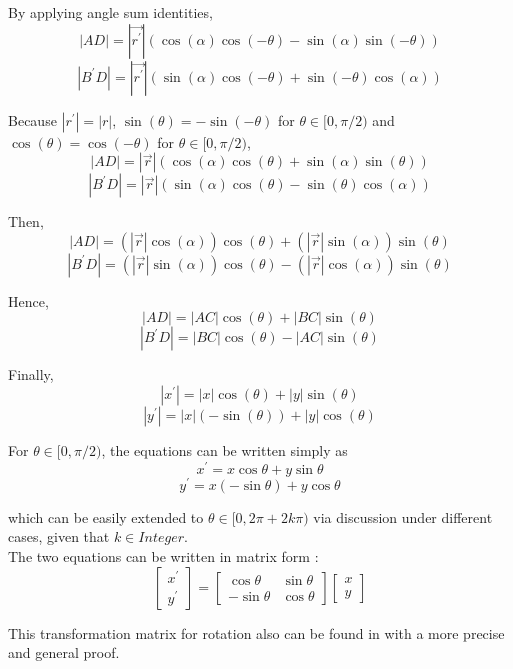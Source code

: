By applying angle sum identities,
$$|AD| = |\vec{r^{'}}| (\cos(\alpha)\cos(-\theta) - \sin(\alpha)\sin(-\theta))$$
$$|B^{'}D| = |\vec{r^{'}}| (\sin(\alpha)\cos(-\theta) + \sin(-\theta)\cos(\alpha))$$

Because $|r^{'}| = |r|$, $\sin(\theta) = - \sin(-\theta)$ for $\theta \in [0, \pi/2)$ and $\cos(\theta) = \cos(-\theta)$ for $\theta \in [0, \pi/2)$,
$$|AD| = |\vec{r}| (\cos(\alpha)\cos(\theta) + \sin(\alpha)\sin(\theta))$$
$$|B^{'}D| = |\vec{r}| (\sin(\alpha)\cos(\theta) - \sin(\theta)\cos(\alpha))$$

Then,
$$|AD| = (|\vec{r}|\cos(\alpha))\cos(\theta) + (|\vec{r}|\sin(\alpha))\sin(\theta)$$
$$|B^{'}D| = (|\vec{r}|\sin(\alpha))\cos(\theta) - (|\vec{r}|\cos(\alpha))\sin(\theta)$$

Hence,
$$|AD| = |AC|\cos(\theta) + |BC|\sin(\theta)$$
$$|B^{'}D| = |BC|\cos(\theta) - |AC|\sin(\theta)$$

Finally,
$$|x^{'}| = |x|\cos(\theta) + |y|\sin(\theta)$$
$$|y^{'}| = |x|(- \sin(\theta)) + |y|\cos(\theta)$$

For $\theta \in [0, \pi/2)$, the equations can be written simply as
$$ x^{'} = x\cos\theta + y\sin\theta$$
$$ y^{'} = x(- \sin\theta) + y\cos\theta$$

which can be easily extended to $\theta \in [ 0, 2\pi + 2k\pi)$ via discussion under different cases, given that $k \in Integer$.\\

The two equations can be written in matrix form :
\begin{equation} \label{Equ_ori}
  \begin{bmatrix}
   x^{'} \\ y^{'}
   \end{bmatrix} =   \begin{bmatrix}
      \cos\theta & \sin\theta \\
      -\sin\theta & \cos\theta
    \end{bmatrix} \begin{bmatrix}
      x \\ y
     \end{bmatrix}
\end{equation}

This transformation matrix for rotation also can be found in \cite{Mitnote09} with a more precise and general proof.


